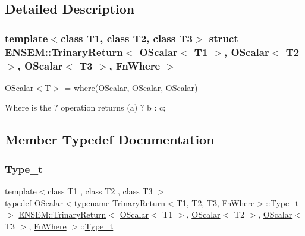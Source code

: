 \subsection{Detailed Description}
\subsubsection*{template$<$class T1, class T2, class T3$>$\newline
struct E\+N\+S\+E\+M\+::\+Trinary\+Return$<$ O\+Scalar$<$ T1 $>$, O\+Scalar$<$ T2 $>$, O\+Scalar$<$ T3 $>$, Fn\+Where $>$}

O\+Scalar$<$\+T$>$ = where(\+O\+Scalar, O\+Scalar, O\+Scalar) 

Where is the ? operation returns (a) ? b \+: c; 

\subsection{Member Typedef Documentation}
\mbox{\label{structENSEM_1_1TrinaryReturn_3_01OScalar_3_01T1_01_4_00_01OScalar_3_01T2_01_4_00_01OScalar_3_01T3_01_4_00_01FnWhere_01_4_a6b5cfd8880a0a52baef8bb62d3af1244}} 
\subsubsection{\texorpdfstring{Type\_t}{Type\_t}\hspace{0.1cm}{\footnotesize\ttfamily [1/3]}}
{\footnotesize\ttfamily template$<$class T1 , class T2 , class T3 $>$ \\
typedef \mbox{\hyperlink{classENSEM_1_1OScalar}{O\+Scalar}}$<$typename \mbox{\hyperlink{structENSEM_1_1TrinaryReturn}{Trinary\+Return}}$<$T1, T2, T3, \mbox{\hyperlink{structENSEM_1_1FnWhere}{Fn\+Where}}$>$\+::\mbox{\hyperlink{structENSEM_1_1TrinaryReturn_3_01OScalar_3_01T1_01_4_00_01OScalar_3_01T2_01_4_00_01OScalar_3_01T3_01_4_00_01FnWhere_01_4_a6b5cfd8880a0a52baef8bb62d3af1244}{Type\+\_\+t}}$>$ \mbox{\hyperlink{structENSEM_1_1TrinaryReturn}{E\+N\+S\+E\+M\+::\+Trinary\+Return}}$<$ \mbox{\hyperlink{classENSEM_1_1OScalar}{O\+Scalar}}$<$ T1 $>$, \mbox{\hyperlink{classENSEM_1_1OScalar}{O\+Scalar}}$<$ T2 $>$, \mbox{\hyperlink{classENSEM_1_1OScalar}{O\+Scalar}}$<$ T3 $>$, \mbox{\hyperlink{structENSEM_1_1FnWhere}{Fn\+Where}} $>$\+::\mbox{\hyperlink{structENSEM_1_1TrinaryReturn_3_01OScalar_3_01T1_01_4_00_01OScalar_3_01T2_01_4_00_01OScalar_3_01T3_01_4_00_01FnWhere_01_4_a6b5cfd8880a0a52baef8bb62d3af1244}{Type\+\_\+t}}}

